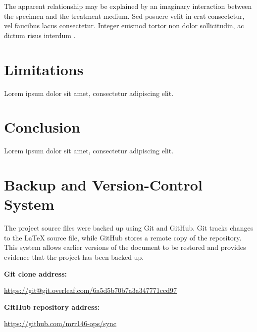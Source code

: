 \documentclass[11pt]{article}
\begin{document}
The apparent relationship may be explained by an imaginary interaction
between the specimen and the treatment medium. Sed posuere velit in
erat consectetur, vel faucibus lacus consectetur. Integer euismod
tortor non dolor sollicitudin, ac dictum risus interdum
\cite{example2023}.


\section{Limitations}

Lorem ipsum dolor sit amet, consectetur adipiscing elit. 

\section{Conclusion}

Lorem ipsum dolor sit amet, consectetur adipiscing elit.

\section{Backup and Version-Control System}

The project source files were backed up using Git and GitHub. Git tracks
changes to the \LaTeX{} source file, while GitHub stores a remote copy
of the repository. This system allows earlier versions of the document
to be restored and provides evidence that the project has been backed
up.


\noindent
\textbf{Git clone address:}
\begin{center}
\url{https://git@git.overleaf.com/6a5d5b70b7a3a347771ccd97}
\end{center}
\textbf{GitHub repository address:}

\begin{center}
\url{https://github.com/mrr146-ops/sync}
\end{center}

\end{document}

